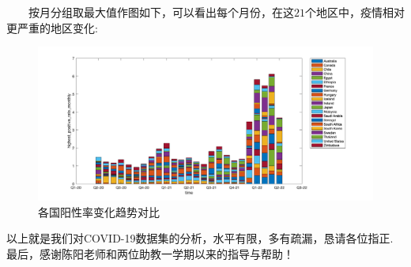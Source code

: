 \documentclass[a4paper, titlepage]{article}
\begin{document}
    　　按月分组取最大值作图如下，可以看出每个月份，在这$21$个地区中，疫情相对更严重的地区变化:\\
    \begin{minipage}{\textwidth}
        \begin{figure}[H]
            \centering
            \includegraphics[width=\textwidth]{./images/PositiveRate_3.png}
            \vspace{-1.5em}
            \caption{各国阳性率变化趋势对比}
            \label{images:PositiveRate_3}
        \end{figure}
    \end{minipage}
    
    \vspace{5cm}
    \begin{center}
    以上就是我们对COVID-19数据集的分析，水平有限，多有疏漏，恳请各位指正. \\
    最后，感谢陈阳老师和两位助教一学期以来的指导与帮助！
    \end{center}
    \newpage
    \appendix
\end{document}
